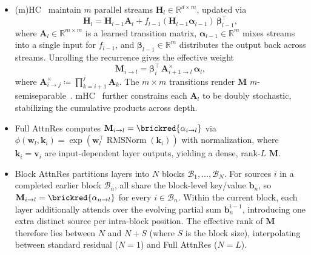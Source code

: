 \begin{itemize}[leftmargin=*]
    \item (m)HC~\cite{zhu2025hyperconnections,xie2026mhc} maintain $m$ parallel streams $\mathbf{H}_{l} \in \mathbb{R}^{d \times m}$, updated via
          \[
              \mathbf{H}_{l} = \mathbf{H}_{l-1} \mathbf{A}_{l} + f_{l-1}(\mathbf{H}_{l-1} \bm{\alpha}_{l-1})\, \bm{\beta}_{l-1}^\top,
          \]
          where $\mathbf{A}_{l} \in \mathbb{R}^{m \times m}$ is a learned transition matrix, $\bm{\alpha}_{l-1} \in \mathbb{R}^{m}$ mixes streams into a single input for $f_{l-1}$, and $\bm{\beta}_{l-1} \in \mathbb{R}^{m}$ distributes the output back across streams.
          Unrolling the recurrence gives the effective weight
          \begin{equation}
              \label{eq:hc-unroll}
              \mathbf{M}_{i \to l} = \bm{\beta}_{i}^\top \, \mathbf{A}_{i+1 \to l}^{\times} \, \bm{\alpha}_{l},
          \end{equation}
          where $\mathbf{A}_{i \to j}^{\times} \coloneqq \prod_{k=i+1}^{j} \mathbf{A}_k$.
          The $m \times m$ transitions render $\mathbf{M}$ $m$-semiseparable~\cite{mamba2}. mHC~\cite{xie2026mhc,yang2026mhclite} further constrains each $\mathbf{A}_l$ to be doubly stochastic, stabilizing the cumulative products across depth.
    \item Full AttnRes computes $\mathbf{M}_{i \to l} = \brickred{\alpha_{i \to l}}$ via $\phi(\bm{w}_l, \bm{k}_i) = \exp\left(\bm{w}_l^\top \operatorname{RMSNorm}(\bm{k}_i)\right)$ with normalization, where $\bm{k}_i = \bm{v}_i$ are input-dependent layer outputs, yielding a dense, rank-$L$ $\mathbf{M}$.
    \item Block AttnRes partitions layers into $N$ blocks $\mathcal{B}_1, \ldots, \mathcal{B}_N$. For sources $i$ in a completed earlier block $\mathcal{B}_n$, all share the block-level key/value $\bm{b}_n$, so $\mathbf{M}_{i \to l} = \brickred{\alpha_{n \to l}}$ for every $i \in \mathcal{B}_n$. Within the current block, each layer additionally attends over the evolving partial sum $\bm{b}_n^{i-1}$, introducing one extra distinct source per intra-block position. The effective rank of $\mathbf{M}$ therefore lies between $N$ and $N + S$ (where $S$ is the block size), interpolating between standard residual ($N{=}1$) and Full AttnRes ($N{=}L$).
\end{itemize}

